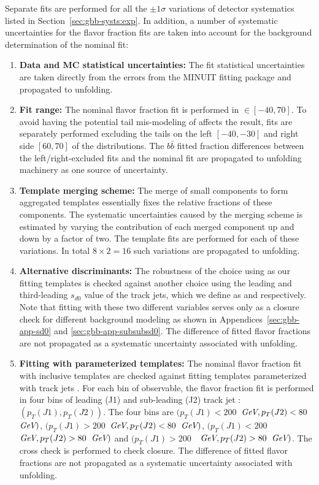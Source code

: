 Separate fits are performed for all the $\pm 1\sigma$ variations of detector systematics listed in Section~\ref{sec:gbb-systs:exp}. In addition, a number of systematic uncertainties for the flavor fraction fits are taken into account for the background determination of the nominal fit:
\begin{enumerate}
  \item \textbf{Data and MC statistical uncertainties:} The fit statistical uncertainties are taken directly from the errors from the MINUIT fitting package and propagated to unfolding.
  \item \textbf{Fit range:} The nominal flavor fraction fit is performed in \subsdzero$\in[-40, 70]$. To avoid having the potential tail mis-modeling of \subsdzero affects the result, fits are separately performed excluding the tails on the left $[-40, -30]$ and right side $[60, 70]$ of the \subsdzero distributions. The $b\bar b$ fitted fraction differences between the left/right-excluded fits and the nominal fit are propagated to unfolding machinery as one source of uncertainty. 
  \item \textbf{Template merging scheme:} The merge of small components to form aggregated templates essentially fixes the relative fractions of these components. The systematic uncertainties caused by the merging scheme is estimated by varying the contribution of each merged component up and down by a factor of two. The template fits are performed for each of these variations. In total $8\times 2 =16$ such variations are propagated to unfolding.
  \item \textbf{Alternative discriminants:} The robustness of the choice using \subsdzero as our fitting templates is checked against another choice using the leading and third-leading $s_{d0}$ value of the track jets, which we define as \sdzero and \subsubsdzero respectively. Note that fitting with these two different variables serves only as a closure check for different background modeling as shown in Appendices~\ref{sec:gbb-app-sd0} and \ref{sec:gbb-app-subsubsd0}. The difference of fitted flavor fractions are not propagated as a systematic uncertainty associated with unfolding.
  \item \textbf{Fitting with \pt parameterized templates:} The nominal flavor fraction fit with inclusive \subsdzero templates are checked against fitting templates parameterized with track jets \pt. For each bin of observable, the flavor fraction fit is performed in four bins of leading (J1) and sub-leading (J2) track jet \pt: $(p_T(J1), p_T(J2))$. The four bins are $(p_T(J1)<200$~$\textit{GeV}, p_T(J2)<80$~$\textit{GeV})$, $(p_T(J1)>200$~$\textit{GeV}, p_T(J2)<80$~$\textit{GeV})$, $(p_T(J1)<200$~$\textit{GeV}, p_T(J2)>80$~$\textit{GeV})$ and $(p_T(J1)>200$~~$\textit{GeV}, p_T(J2)>80$~$\textit{GeV})$. The cross check is performed to check closure. The difference of fitted flavor fractions are not propagated as a systematic uncertainty associated with unfolding.

\end{enumerate}
